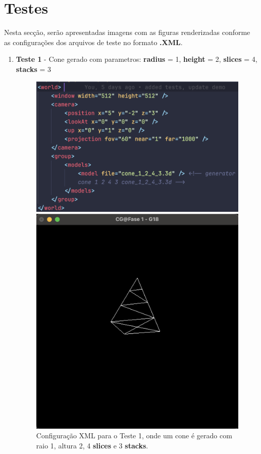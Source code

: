 \documentclass[12pt,a4paper]{report}%
\begin{document}
\chapter{Testes} \label{chap:testes}
Nesta secção, serão apresentadas imagens com as figuras renderizadas conforme as configurações dos arquivos de teste no formato \textbf{.XML}.
\begin{enumerate}
    \item \textbf{Teste 1} - Cone gerado com parametros: \textbf{radius} = 1, \textbf{height} = 2, \textbf{slices} = 4, \textbf{stacks} = 3 
    \begin{figure}[H]
    \centering
    \begin{minipage}{0.49\linewidth}
        \centering
        \includegraphics[width=\linewidth]{images/xmlTeste1.png}
        \caption[Teste 1 - XML]{Configuração XML para o Teste 1, onde um cone é gerado com raio 1, altura 2, 4 \textbf{slices} e 3 \textbf{stacks}.}
        \label{fig:xml-teste1}
    \end{minipage}
    \hfill
    \begin{minipage}{0.49\linewidth}
        \centering
        \includegraphics[width=\linewidth]{images/Teste1.png}

\end{minipage}
\end{figure}
\end{enumerate}
\end{document}
